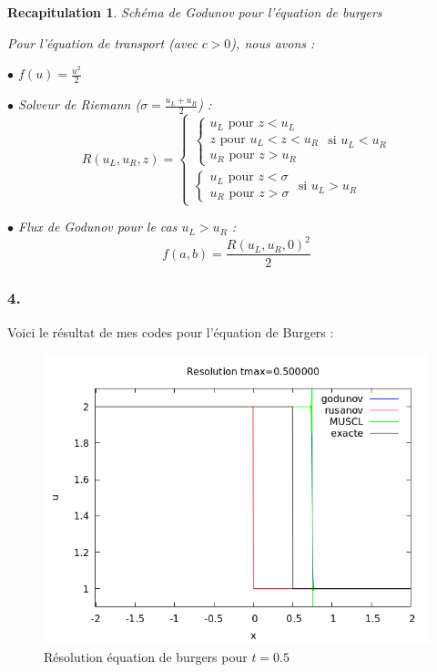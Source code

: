 \documentclass{article}
\newtheorem{recap}{Recapitulation}
\begin{document}
\begin{recap}{Schéma de Godunov pour l'équation de burgers}

Pour l'équation de transport (avec $c>0$), nous avons :

$\bullet$ $f(u) = \frac{u^2}{2}$

$\bullet$ Solveur de Riemann ($\sigma = \frac{u_L+u_R}{2}$) :
\[ R(u_L, u_R, z) = \left\{ \begin{matrix}

	\left\{ \begin{matrix}
		u_L \text{ pour } z < u_L \\
		z \text{ pour } u_L < z < u_R \\
		u_R \text{ pour } z > u_R	
	\end{matrix} \right. \text{ si } u_L < u_R \\	
	
	\left\{ \begin{matrix} 
		u_L \text{ pour } z < \sigma \\
		u_R \text{ pour } z > \sigma
	\end{matrix} \right. \text{ si } u_L > u_R

	\end{matrix} \right. \]

$\bullet$ Flux de Godunov pour le cas $u_L > u_R$ :
\[ f(a,b) = \frac{R(u_L,u_R,0)^2}{2}\]

\end{recap}

\subsubsection*{4.}

Voici le résultat de mes codes pour l'équation de Burgers :

\begin{figure}[H]
	\centering
	\includegraphics[scale=0.5]{figure/burgers_1.png}
	\caption{Résolution équation de burgers pour $t=0.5$}
\end{figure} 
\end{document}
